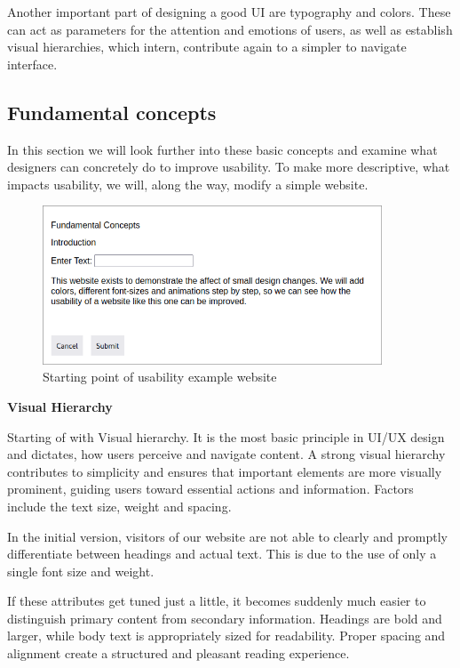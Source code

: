 \blankLine

Another important part of designing a good UI are typography and colors. These
can act as parameters for the attention and emotions of users, as well as establish visual hierarchies, which intern, contribute again to a simpler to navigate interface. \autocite{Paul:UIUXIntroduction}

\subsection{Fundamental concepts}
In this section we will look further into these basic concepts and examine what designers can concretely do to improve usability. To make more descriptive, what impacts usability, we will, along the way, modify a simple website.

\blankLine

\begin{figure} [H]
    \center
    \includegraphics [width=0.9\textwidth] {images/paul/usabilityExamples/initialWebsite.png}
    \caption{Starting point of usability example website}
\end{figure}

\textbf{Visual Hierarchy}

Starting of with Visual hierarchy. It is the most basic principle in UI/UX design and dictates, how users perceive and navigate content. A strong visual hierarchy contributes to simplicity and ensures that important elements are more visually prominent, guiding users toward essential actions and information. Factors include the text size, weight and spacing. 

\blankLine

In the initial version, visitors of our website are not able to clearly and promptly differentiate between headings and actual text. This is due to the use of only a single font size and weight.


\blankLine

    If these attributes get tuned just a little, it becomes suddenly much easier to distinguish primary content from secondary information. Headings are bold and larger, while body text is appropriately sized for readability. Proper spacing and alignment create a structured and pleasant reading experience.
    

